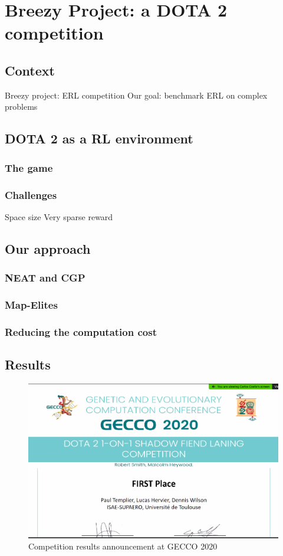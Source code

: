 \chapter{Breezy Project: a DOTA 2 competition}
\label{chap:dota}

\section{Context}
Breezy project: ERL competition
Our goal: benchmark ERL on complex problems

\section{DOTA 2 as a RL environment}
\subsection{The game}

\subsection{Challenges}
Space size
Very sparse reward


\section{Our approach}
\subsection{NEAT and CGP}
\subsection{Map-Elites}
\subsection{Reducing the computation cost}

\section{Results}

\begin{figure}[H]
\centering
\includegraphics[width=12cm]{images/breezy-win.png}
\caption{Competition results announcement at GECCO 2020}
\end{figure}

